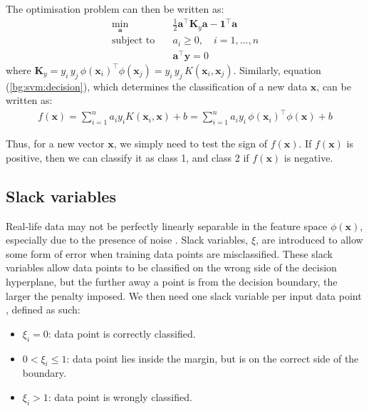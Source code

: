 \documentclass[12pt, twoside, a4paper]{report}
\def\vec{\boldsymbol}
\begin{document}
The optimisation problem can then be written as:
\begin{align*}
\min_{\vec a} \quad &\frac{1}{2} \vec{a}^\top \vec{K}_y \vec{a} - \vec{1}^\top \vec a \\
\text{subject to} \quad &a_i \geq 0, \quad i = 1, \dots , n \\
&\vec{a}^\top \vec y = 0
\end{align*}
where $\vec{K}_y = y_i \, y_j \, \phi(\vec{x}_i)^\top \phi(\vec{x}_j) = y_i \, y_j \, K(\vec{x}_i, \vec{x}_j)$. Similarly, equation (\ref{bg:svm:decision}), which determines the classification of a new data $\vec{x}$, can be written as:
\begin{align*}
f(\vec{x}) = \sum_{i=1}^n a_i y_i K(\vec{x}_i, \vec{x}) + b = \sum_{i=1}^n a_i y_i \, \phi(\vec{x}_i)^\top \phi(\vec{x}) + b
\end{align*}

Thus, for a new vector $\vec{x}$, we simply need to test the sign of $f(\vec{x})$. If $f(\vec{x})$ is positive, then we can classify it as class 1, and class 2 if $f(\vec{x})$ is negative.

\subsection{Slack variables}
Real-life data may not be perfectly linearly separable in the feature space $\phi(\vec{x})$, especially due to the presence of noise \cite{RefWorks:127}. Slack variables, $\xi$, are introduced to allow some form of error when training data points are misclassified. These slack variables allow data points to be classified on the wrong side of the decision hyperplane, but the further away a point is from the decision boundary, the larger the penalty imposed. We then need one slack variable per input data point \cite{RefWorks:126}, defined as such:
\begin{itemize}
\item $\xi_i = 0$: data point is correctly classified.
\item $0 < \xi_i \leq 1$: data point lies inside the margin, but is on the correct side of the boundary.
\item $\xi_i > 1$: data point is wrongly classified.
\end{itemize}
\end{document}
